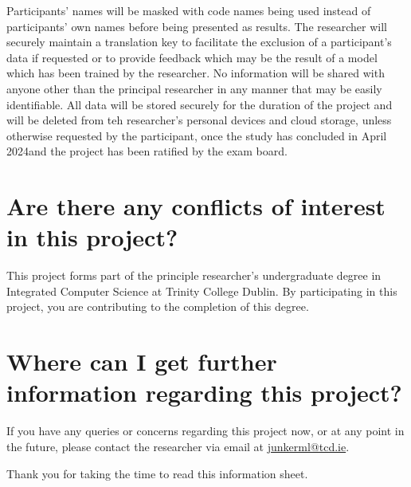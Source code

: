 \documentclass[a4paper,12pt]{article}
\newcommand{\deadline}{April 2024}
\begin{document}
Participants' names will be masked with code names being used instead of participants' own names before being presented as results. The researcher will securely maintain a translation key to facilitate the exclusion of a participant's data if requested or to provide feedback which may be the result of a model which has been trained by the researcher. No information will be shared with anyone other than the principal researcher in any manner that may be easily identifiable. All data will be stored securely for the duration of the project and will be deleted from teh researcher's personal devices and cloud storage, unless otherwise requested by the participant, once the study has concluded in \deadline and the project has been ratified by the exam board.
\section*{Are there any conflicts of interest in this project?}
This project forms part of the principle researcher's undergraduate degree in Integrated Computer Science at Trinity College Dublin. By participating in this project, you are contributing to the completion of this degree.
\section*{Where can I get further information regarding this project?}
If you have any queries or concerns regarding this project now, or at any point in the future, please contact the researcher via email at \href{mailto:junkerml@tcd.ie}{junkerml@tcd.ie}.

\vspace{1cm}

Thank you for taking the time to read this information sheet.
\end{document}

